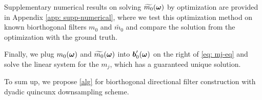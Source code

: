 Supplementary numerical results on solving $\widetilde{m_{0}}(\boldsymbol{\omega})$ by optimization are provided in Appendix \ref{app: supp-numerical}, where we test this optimization method on known biorthogonal filters $m_0$ and $\widetilde{m_0}$ and compare the solution from the optimization with the ground truth.

Finally, we plug $m_0(\boldsymbol{\omega})$ and $\widetilde{m_{0}}(\boldsymbol{\omega})$ into $\boldsymbol{b}_0'(\boldsymbol{\omega})$ on the right of \eqref{eq: mj-eq} and solve the linear system for the $m_j$, which has a guaranteed unique solution.

To sum up, we propose \ref{alg} for biorthogonal directional filter construction with dyadic quincunx downsampling scheme.

